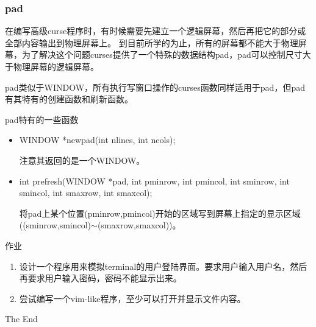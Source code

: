 \documentclass{beamer}
\begin{document}
\begin{frame}
\frametitle{pad}
在编写高级curse程序时，有时候需要先建立一个逻辑屏幕，然后再把它的部分或全部内容输出到物理屏幕上。
到目前所学的为止，所有的屏幕都不能大于物理屏幕，为了解决这个问题curses提供了一个特殊的数据结构pad，pad可以控制尺寸大于物理屏幕的逻辑屏幕。

pad类似于WINDOW，所有执行写窗口操作的curses函数同样适用于pad，但pad有其特有的创建函数和刷新函数。
\begin{block}{pad特有的一些函数}
\begin{itemize}
\item
WINDOW *newpad(int nlines, int ncols);

注意其返回的是一个WINDOW。
\item
int prefresh(WINDOW *pad, int pminrow, int pmincol,
             int sminrow, int smincol, int smaxrow, int smaxcol);

将pad上某个位置(pminrow,pmincol)开始的区域写到屏幕上指定的显示区域((sminrow,smincol)$\sim$(smaxrow,smaxcol))。

\end{itemize}
\end{block}

\end{frame}


\begin{frame}{作业}
\begin{enumerate}
\item
设计一个程序用来模拟terminal的用户登陆界面。要求用户输入用户名，然后再要求用户输入密码，密码不能显示出来。
\item
尝试编写一个vim-like程序，至少可以打开并显示文件内容。
\end{enumerate}
\end{frame}


\begin{frame}
\Huge{\centerline{The End}}
\end{frame}
\end{document}
